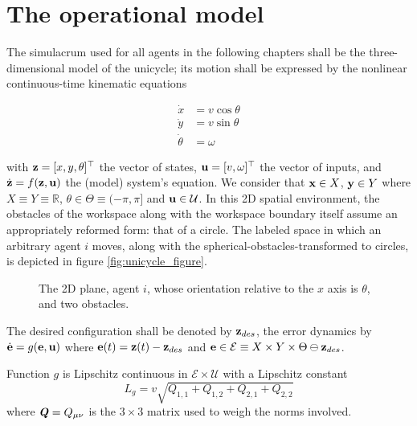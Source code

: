 \section{The operational model}

The simulacrum used for all agents in the following chapters shall be the
three-dimensional model of the unicycle; its motion shall be expressed by the
nonlinear continuous-time kinematic equations

\begin{align}
\label{eq:unicycle_kinematic}
  \dot{x}       &= v \cos\theta \\
  \dot{y}       &= v \sin\theta \\
  \dot{\theta}  &= \omega
\end{align}

with $\bm{\mathbf{z}} = [x,y,\theta]^{\top}$ the vector of states,
$\bm{\mathbf{u}} = [v, \omega]^{\top}$ the vector of inputs, and $\dot{\bm{\mathbf{z}}} =
f(\bm{\mathbf{z}}, \bm{\mathbf{u}})$ the (model) system's equation. We consider that
$\bm{\mathbf{x}} \in X$, $\bm{\mathbf{y}} \in Y$ where $X \equiv Y \equiv \mathbb{R}$,
$\theta \in \Theta \equiv (-\pi, \pi]$ and $\bm{\mathbf{u}} \in \mathcal{U}$.
In this 2D spatial environment, the obstacles of the workspace along with the
workspace boundary itself assume an appropriately reformed form: that of a
circle. The labeled space in which an arbitrary agent $i$ moves, along with the
spherical-obstacles-transformed to circles, is depicted in figure
\eqref{fig:unicycle_figure}.

\begin{figure}[H]\centering
  
  \caption{The 2D plane, agent $i$, whose orientation relative to the $x$
    axis is $\theta$, and two obstacles.}
  \label{fig:unicycle_figure}
\end{figure}

The desired configuration shall be denoted by $\bm{\mathbf{z}}_{des}$,
the error dynamics by $\dot{\bm{\mathbf{e}}} = g(\bm{\mathbf{e}}, \bm{\mathbf{u}})$
where $\bm{\mathbf{e}}(t) = \bm{\mathbf{z}}(t) - \bm{\mathbf{z}}_{des}$ and
$\bm{\mathbf{e}} \in \mathcal{E} \equiv X \times Y \times \Theta \ominus \bm{\mathbf{z}}_{des}$.

\begin{lemma}
  \label{lemma:lipschitz_unicycle}
  Function $g$ is Lipschitz continuous in $\mathcal{E} \times \mathcal{U}$ with
  a Lipschitz constant $$L_g = v \sqrt{Q_{1,1}+Q_{1,2}+Q_{2,1}+Q_{2,2}}$$
  where $\bm{\mathit{Q}} = Q_{\mu\nu}$ is the $3 \times 3$ matrix used to weigh the
  norms involved.
\end{lemma}

